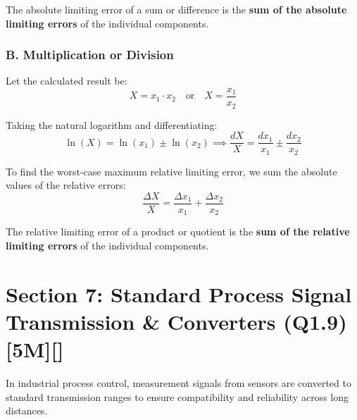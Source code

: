 The absolute limiting error of a sum or difference is the \textbf{sum of the absolute limiting errors} of the individual components.

\subsubsection{B. Multiplication or Division}
Let the calculated result be:
\[ X = x_1 \cdot x_2 \quad \text{or} \quad X = \frac{x_1}{x_2} \]

Taking the natural logarithm and differentiating:
\[ \ln(X) = \ln(x_1) \pm \ln(x_2) \implies \frac{dX}{X} = \frac{dx_1}{x_1} \pm \frac{dx_2}{x_2} \]

To find the worst-case maximum relative limiting error, we sum the absolute values of the relative errors:
\[ \frac{\Delta X}{X} = \frac{\Delta x_1}{x_1} + \frac{\Delta x_2}{x_2} \]

The relative limiting error of a product or quotient is the \textbf{sum of the relative limiting errors} of the individual components.


\section{Section 7: Standard Process Signal Transmission \& Converters (Q1.9) [5M][]}

In industrial process control, measurement signals from sensors are converted to standard transmission ranges to ensure compatibility and reliability across long distances.

